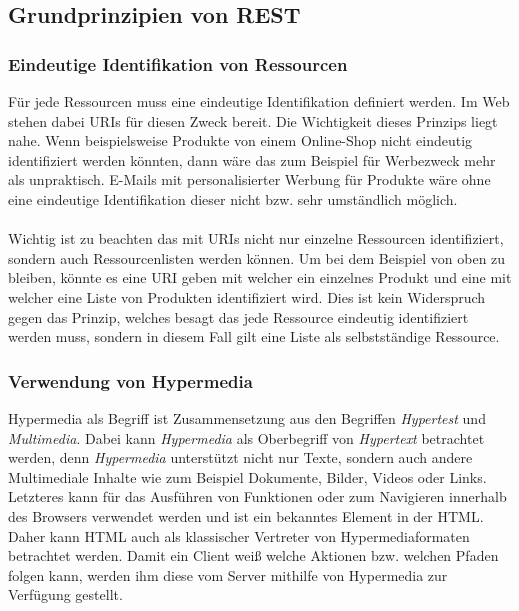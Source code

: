 \subsection{Grundprinzipien von REST}
\subsubsection{Eindeutige Identifikation von Ressourcen}
Für jede Ressourcen muss eine eindeutige Identifikation definiert werden. Im Web stehen dabei \glspl{URI} für diesen Zweck bereit. Die Wichtigkeit dieses Prinzips liegt nahe. Wenn beispielsweise Produkte von einem Online-Shop nicht eindeutig identifiziert werden könnten, dann wäre das zum Beispiel für Werbezweck mehr als unpraktisch. E-Mails mit personalisierter Werbung für Produkte wäre ohne eine eindeutige Identifikation dieser nicht bzw. sehr umständlich möglich.\\
\\
Wichtig ist zu beachten das mit \glspl{URI} nicht nur einzelne Ressourcen identifiziert, sondern auch Ressourcenlisten werden können. Um bei dem Beispiel von oben zu bleiben, könnte es eine \gls{URI} geben mit welcher ein einzelnes Produkt und eine mit welcher eine Liste von Produkten identifiziert wird. Dies ist kein Widerspruch gegen das Prinzip, welches besagt das jede Ressource eindeutig identifiziert werden muss, sondern in diesem Fall gilt eine Liste als selbstständige Ressource.

\subsubsection{Verwendung von Hypermedia}
Hypermedia als Begriff ist Zusammensetzung aus den Begriffen \textit{Hypertest} und \textit{Multimedia}. Dabei kann \textit{Hypermedia} als Oberbegriff von \textit{Hypertext} betrachtet werden, denn \textit{Hypermedia} unterstützt nicht nur Texte, sondern auch andere Multimediale Inhalte wie zum Beispiel Dokumente, Bilder, Videos oder Links. Letzteres kann für das Ausführen von Funktionen oder zum Navigieren innerhalb des Browsers verwendet werden und ist ein bekanntes Element in der \gls{HTML}. Daher kann \gls{HTML} auch als klassischer Vertreter von Hypermediaformaten betrachtet werden. Damit ein Client weiß welche Aktionen bzw. welchen Pfaden folgen kann, werden ihm diese vom Server mithilfe von Hypermedia zur Verfügung gestellt.

